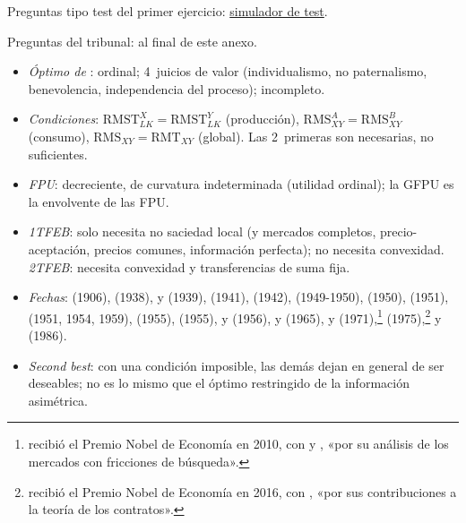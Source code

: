 \documentclass[11pt]{article}
\begin{document}
\begin{anotaciones}
Preguntas tipo test del primer ejercicio: \href{https://www.victorgutierrezmarcos.es/oposicion/temario/primer-ejercicio/test/simulador.html?tema=3.A.22}{simulador de test}.

Preguntas del tribunal: al final de este anexo.
\end{anotaciones}

\begin{itemize}
\item \emph{Óptimo de }: ordinal; 4~juicios de valor (individualismo, no paternalismo, benevolencia, independencia del proceso); incompleto.
\item \emph{Condiciones}: $\mathrm{RMST}^X_{LK}=\mathrm{RMST}^Y_{LK}$ (producción), $\mathrm{RMS}^A_{XY}=\mathrm{RMS}^B_{XY}$ (consumo), $\mathrm{RMS}_{XY}=\mathrm{RMT}_{XY}$ (global). Las 2~primeras son necesarias, no suficientes.
\item \emph{FPU}: decreciente, de curvatura indeterminada (utilidad ordinal); la GFPU es la envolvente de las FPU.
\item \emph{1TFEB}: solo necesita no saciedad local (y mercados completos, precio-aceptación, precios comunes, información perfecta); no necesita convexidad. \emph{2TFEB}: necesita convexidad y transferencias de suma fija.
\item \emph{Fechas}:  (1906),  (1938),  y  (1939),  (1941),  (1942),  (1949-1950),  (1950),  (1951),  (1951, 1954, 1959),  (1955),  (1955),  y  (1956),  y  (1965),  y  (1971),\footnote{ recibió el Premio Nobel de Economía en 2010, con  y , «por su análisis de los mercados con fricciones de búsqueda»\nocite{Nobel2010DiamondMortensenPissarides}.}  (1975),\footnote{ recibió el Premio Nobel de Economía en 2016, con , «por sus contribuciones a la teoría de los contratos»\nocite{Nobel2016HartHolmstrom}.}  y  (1986).
\item \emph{Second best}: con una condición imposible, las demás dejan en general de ser deseables; no es lo mismo que el óptimo restringido de la información asimétrica.
\end{itemize}
\end{document}
